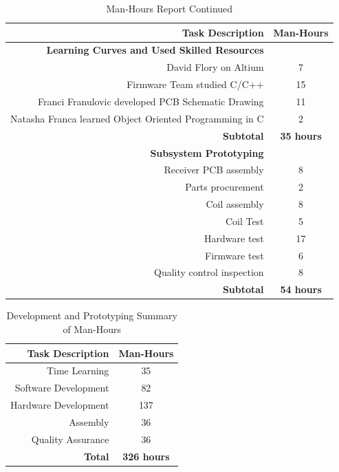 \documentclass[12pt]{article}
\begin{document}
\hfill
\pagebreak
\hfill

\begin{table}[h!]
\centering
\caption*{Man-Hours Report Continued}
\begin{tabular}{ | r | c | }
\hline
\hline
\textbf{Task Description} & \textbf{Man-Hours}\\
\hline
\hline
\hline
\textbf{Learning Curves and Used Skilled Resources} & \\
 \hline 
David Flory on Altium &  7 \\
 \hline
Firmware Team studied C/C++ & 15 \\
 \hline
Franci Franulovic developed PCB Schematic Drawing & 11 \\
 \hline
Natasha Franca learned Object Oriented Programming in C & 2 \\
 \hline
\textbf{Subtotal} & \textbf{35 hours}\\
\hline
\hline
\textbf{Subsystem Prototyping} & \\
 \hline 
Receiver PCB assembly & 8 \\
 \hline
Parts procurement & 2 \\
 \hline
Coil assembly  & 8\\
 \hline
Coil Test & 5 \\
 \hline
Hardware test & 17 \\
 \hline
Firmware test & 6\\
 \hline
Quality control inspection & 8 \\
\hline
\textbf{Subtotal} & \textbf{54 hours} \\
\hline
\end{tabular}
\end{table}

\hfill 

\begin{table}[h!]
\centering
\caption{Development and Prototyping Summary of Man-Hours}
\begin{tabular} { | r | c | }
\hline
\textbf{Task Description} & \textbf{Man-Hours} \\
\hline
Time Learning & 35\\
\hline
Software Development & 82 \\
 \hline
Hardware Development & 137 \\
 \hline
Assembly & 36\\
 \hline
Quality Assurance & 36\\
 \hline
\textbf{Total} & \textbf{326 hours}\\
\hline
\end{tabular}
\end{table}
\end{document}
